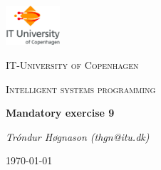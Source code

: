 
\begin{titlepage}
	\centering
	\includegraphics[width=0.15\textwidth]{logo}\par\vspace{1cm}
	{\scshape\LARGE IT-University of Copenhagen \par}
	\vspace{1cm}
	{\scshape\Large Intelligent systems programming\par}
	\vspace{1.5cm}
	{\huge\bfseries Mandatory exercise 9\par}
	\vspace{2cm}
	{\Large\itshape Tróndur Høgnason (thgn@itu.dk)\par}
\vspace{\fill}
	{\large \today\par}
\end{titlepage}